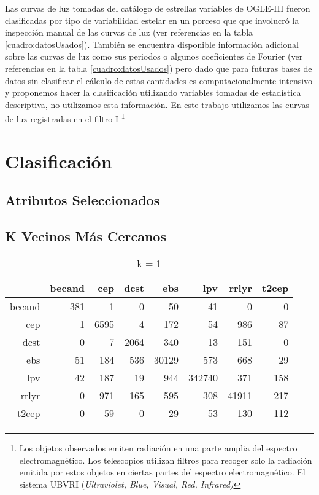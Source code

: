 \documentclass[letterpaper,12pt]{book}
\begin{document}
Las curvas de luz tomadas del catálogo de estrellas variables de OGLE-III fueron clasificadas por tipo de variabilidad estelar en un porceso que que involucró la inspección manual de las curvas de luz (ver referencias en la tabla \ref{cuadro:datosUsados}). También se encuentra disponible información adicional sobre las curvas de luz como sus periodos o algunos coeficientes de Fourier (ver referencias en la tabla \ref{cuadro:datosUsados}) pero dado que para futuras bases de datos sin clasificar el cálculo de estas cantidades es computacionalmente intensivo y proponemos hacer la clasificación utilizando variables tomadas de estadística descriptiva, no utilizamos esta información. En este trabajo utilizamos las curvas de luz registradas en el filtro I \footnote{Los objetos observados emiten radiación en una parte amplia del espectro electromagnético. Los telescopios utilizan filtros para recoger solo la radiación emitida por estos objetos en ciertas partes del espectro electromagnético. El sistema UBVRI (\textit{Ultraviolet, Blue, Visual, Red, Infrared)}  }  

\chapter{Clasificación}\label{cap:clasificacion}



\section{Atributos Seleccionados \label{sec:atributos}}

\section{K Vecinos Más Cercanos}
\begin{table}[ht]
\centering
\begin{tabular}{rrrrrrrr}
  \hline
 & becand & cep & dcst & ebs & lpv & rrlyr & t2cep \\ 
  \hline
becand & 381 &   1 &   0 &  50 &  41 &   0 &   0 \\ 
  cep &   1 & 6595 &   4 & 172 &  54 & 986 &  87 \\ 
  dcst &   0 &   7 & 2064 & 340 &  13 & 151 &   0 \\ 
  ebs &  51 & 184 & 536 & 30129 & 573 & 668 &  29 \\ 
  lpv &  42 & 187 &  19 & 944 & 342740 & 371 & 158 \\ 
  rrlyr &   0 & 971 & 165 & 595 & 308 & 41911 & 217 \\ 
  t2cep &   0 &  59 &   0 &  29 &  53 & 130 & 112 \\ 
   \hline
\end{tabular}
\caption{k = 1} 
\label{table:cmknn}
\end{table}
\end{document}
